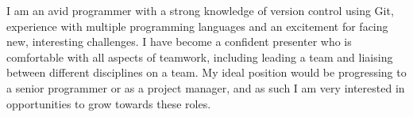 

\begin{cvparagraph}
    I am an avid programmer with a strong knowledge of version control using Git, experience with multiple programming languages and an excitement for facing new, interesting challenges. I have become a confident presenter who is comfortable with all aspects of teamwork, including leading a team and liaising between different disciplines on a team. My ideal position would be progressing to a senior programmer or as a project manager, and as such I am very interested in opportunities to grow towards these roles.
\end{cvparagraph}
